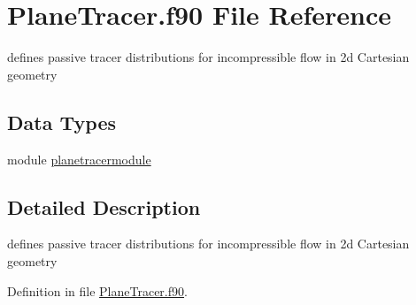 \hypertarget{PlaneTracer_8f90}{\section{Plane\+Tracer.\+f90 File Reference}
\label{PlaneTracer_8f90}
}


defines passive tracer distributions for incompressible flow in 2d Cartesian geometry  


\subsection*{Data Types}
\begin{DoxyCompactItemize}
\item 
module \hyperlink{classplanetracermodule}{planetracermodule}
\end{DoxyCompactItemize}


\subsection{Detailed Description}
defines passive tracer distributions for incompressible flow in 2d Cartesian geometry 



Definition in file \hyperlink{PlaneTracer_8f90_source}{Plane\+Tracer.\+f90}.

